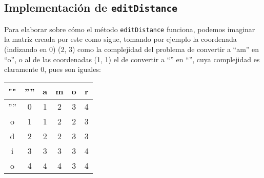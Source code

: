 \documentclass[a4paper, 12pt]{article}
\begin{document}
\subsection{Implementación de \texttt{editDistance}}

Para elaborar sobre cómo el método \texttt{editDistance} funciona, 
podemos imaginar la matriz creada por este
como sigue, tomando por ejemplo la coordenada (indizando en 0) (2, 3) como la
complejidad del problema de convertir a “am” en “o”, o al de las coordenadas
(1, 1) el de convertir a “” en “”, cuya complejidad es claramente 0, pues son
iguales:

\begin{center}
    \begin{tabular}{| c | c | c | c | c | c |}
        \hline 
        "" & '''' & a & m & o & r \\
        \hline
        '''' & 0  & 1 & 2 & 3 & 4 \\
        \hline
        o  & 1  & 1 & 2 & 2 & 3 \\
        \hline
        d  & 2  & 2 & 2 & 3 & 3 \\
        \hline
        i  & 3  & 3 & 3 & 3 & 4 \\
        \hline
        o  & 4  & 4 & 4 & 3 & 4 \\
        \hline

    \end{tabular}
\end{center}
\end{document}
